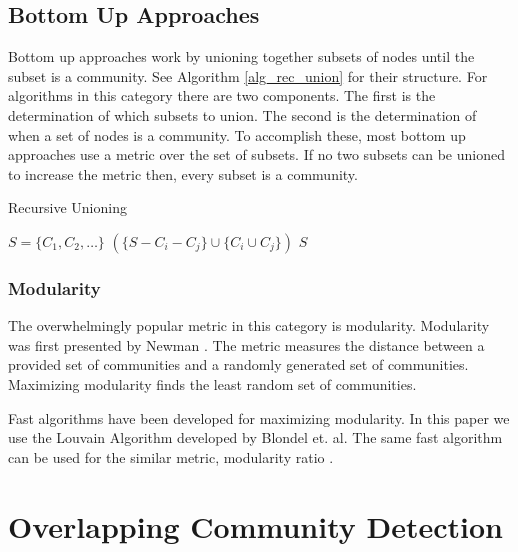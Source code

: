 \documentclass[phd,tocprelim]{cornell}
\renewcommand{\caption}[1]{\singlespacing\hangcaption{#1}\normalspacing}
\begin{document}
\subsection{Bottom Up Approaches}
\label{sec:bottom_up}

Bottom up approaches work by unioning together subsets of nodes until the subset is a community.  See Algorithm \ref{alg_rec_union} for their structure.  For algorithms in this category there are two components.  The first is the determination of which subsets to union.  The second is the determination of when a set of nodes is a community.  To accomplish these, most bottom up approaches use a metric over the set of subsets.  If no two subsets can be unioned to increase the metric then, every subset is a community.

\begin{algorithm}                              %
\caption{{\sc Recursive Unioning}}         %
\label{alg_bottom_up}                                   %
\begin{algorithmic}                        %
\REQUIRE $S = \{C_1, C_2, \dots \}$
$(\{S - C_i - C_j\} \cup \{C_i \cup C_j\})$
\ELSE
\RETURN $S$
\ENDIF
\end{algorithmic}
\label{alg_rec_union}
\end{algorithm}

\subsubsection{Modularity}

The overwhelmingly popular metric in this category is modularity.  Modularity was first presented by Newman \cite{newman}.  The metric measures the distance between a provided set of communities and a randomly generated set of communities.  Maximizing modularity finds the least random set of communities.

Fast algorithms have been developed for maximizing modularity.  In this paper we use the Louvain Algorithm developed by Blondel et. al\cite{blondel}.  The same fast algorithm can be used for the similar metric, modularity ratio \cite{JTODO}.

\section{Overlapping Community Detection}
\end{document}
